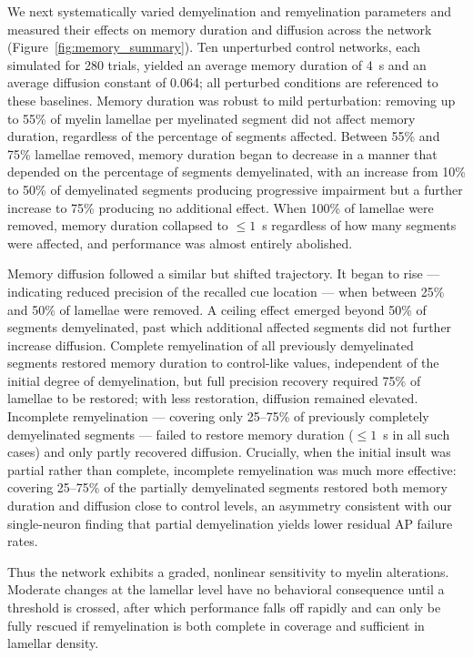 \documentclass[11pt]{article}
\begin{document}
We next systematically varied demyelination and remyelination parameters and measured their effects on memory duration and diffusion across the network (Figure~\ref{fig:memory_summary}). Ten unperturbed control networks, each simulated for 280 trials, yielded an average memory duration of 4~s and an average diffusion constant of 0.064; all perturbed conditions are referenced to these baselines. Memory duration was robust to mild perturbation: removing up to 55\% of myelin lamellae per myelinated segment did not affect memory duration, regardless of the percentage of segments affected. Between 55\% and 75\% lamellae removed, memory duration began to decrease in a manner that depended on the percentage of segments demyelinated, with an increase from 10\% to 50\% of demyelinated segments producing progressive impairment but a further increase to 75\% producing no additional effect. When 100\% of lamellae were removed, memory duration collapsed to $\leq 1$~s regardless of how many segments were affected, and performance was almost entirely abolished.

Memory diffusion followed a similar but shifted trajectory. It began to rise --- indicating reduced precision of the recalled cue location --- when between 25\% and 50\% of lamellae were removed. A ceiling effect emerged beyond 50\% of segments demyelinated, past which additional affected segments did not further increase diffusion. Complete remyelination of all previously demyelinated segments restored memory duration to control-like values, independent of the initial degree of demyelination, but full precision recovery required 75\% of lamellae to be restored; with less restoration, diffusion remained elevated. Incomplete remyelination --- covering only 25--75\% of previously completely demyelinated segments --- failed to restore memory duration ($\leq 1$~s in all such cases) and only partly recovered diffusion. Crucially, when the initial insult was partial rather than complete, incomplete remyelination was much more effective: covering 25--75\% of the partially demyelinated segments restored both memory duration and diffusion close to control levels, an asymmetry consistent with our single-neuron finding that partial demyelination yields lower residual AP failure rates.

Thus the network exhibits a graded, nonlinear sensitivity to myelin alterations. Moderate changes at the lamellar level have no behavioral consequence until a threshold is crossed, after which performance falls off rapidly and can only be fully rescued if remyelination is both complete in coverage and sufficient in lamellar density.
\end{document}
